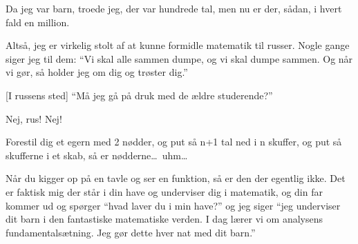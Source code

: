 \documentclass[a4paper,11pt]{article}
\begin{document}
\begin{sketch}
 Da jeg var barn, troede jeg, der var hundrede tal, men nu er der, sådan, i hvert fald en million.

 Altså, jeg er virkelig stolt af at kunne formidle matematik til russer. Nogle gange siger jeg til dem: “Vi skal alle sammen dumpe, og vi skal dumpe sammen. Og når vi gør, så holder jeg om dig og trøster dig.”


[I russens sted] “Må jeg gå på druk med de ældre studerende?”

 Nej, rus! Nej!

 Forestil dig et egern med 2 nødder, og put så n+1 tal ned i n skuffer, og put så skufferne i et skab, så er nødderne\ldots\ uhm\ldots

 Når du kigger op på en tavle og ser en funktion, så er den der egentlig ikke. Det er faktisk mig der står i din have og underviser dig i matematik, og din far kommer ud og spørger “hvad laver du i min have?” og jeg siger “jeg underviser dit barn i den fantastiske matematiske verden. I dag lærer vi om analysens fundamentalsætning. Jeg gør dette hver nat med dit barn.”
\end{sketch}
\end{document}
